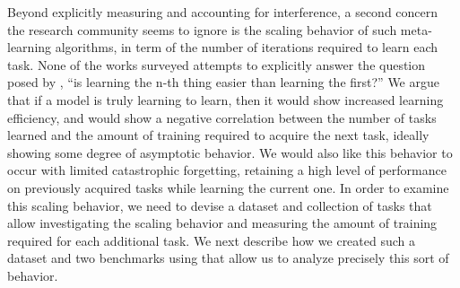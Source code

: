 Beyond explicitly measuring and accounting for interference, a second concern the research community seems to ignore is the scaling behavior of such meta-learning algorithms, in term of the number of iterations required to learn each task. None of the works surveyed attempts to explicitly answer the question posed by \textcite{Thrun1996} , ``is learning the n-th thing easier than learning the first?'' We argue that if a model is truly learning to learn, then it would show increased learning efficiency, and would show a negative correlation between the number of tasks learned and the amount of training required to acquire the next task, ideally showing some degree of asymptotic behavior. We would also like this behavior to occur with limited catastrophic forgetting, retaining a high level of performance on previously acquired tasks while learning the current one. In order to examine this scaling behavior, we need to devise a dataset and collection of tasks that allow investigating the scaling behavior and measuring the amount of training required for each additional task. We next describe how we created such a dataset and two benchmarks using that allow us to analyze precisely this sort of behavior.

